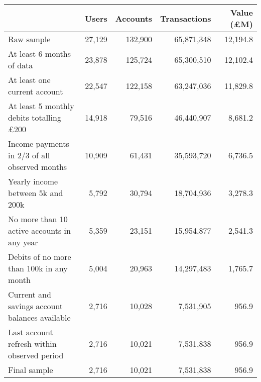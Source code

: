 \begin{tabular}{lrrrr}
\toprule
                                               &  Users & Accounts & Transactions & Value (\pounds M) \\
\midrule
                                    Raw sample & 27,129 &  132,900 &   65,871,348 &          12,194.8 \\
                     At least 6 months of data & 23,878 &  125,724 &   65,300,510 &          12,102.4 \\
                  At least one current account & 22,547 &  122,158 &   63,247,036 &          11,829.8 \\
At least 5 monthly debits totalling \pounds200 & 14,918 &   79,516 &   46,440,907 &           8,681.2 \\
 Income payments in 2/3 of all observed months & 10,909 &   61,431 &   35,593,720 &           6,736.5 \\
             Yearly income between 5k and 200k &  5,792 &   30,794 &   18,704,936 &           3,278.3 \\
   No more than 10 active accounts in any year &  5,359 &   23,151 &   15,954,877 &           2,541.3 \\
      Debits of no more than 100k in any month &  5,004 &   20,963 &   14,297,483 &           1,765.7 \\
Current and savings account balances available &  2,716 &   10,028 &    7,531,905 &             956.9 \\
   Last account refresh within observed period &  2,716 &   10,021 &    7,531,838 &             956.9 \\
                                  Final sample &  2,716 &   10,021 &    7,531,838 &             956.9 \\
\bottomrule
\end{tabular}
